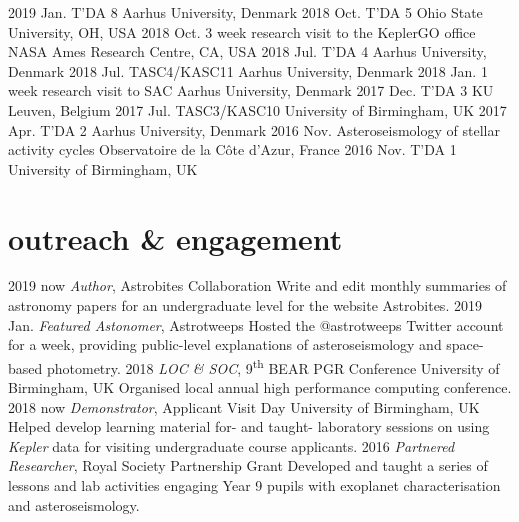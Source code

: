 \documentclass[]{k-cv} %
\begin{document}
\begin{entrylist}
\entrythree
{2019 Jan.}
{T'DA 8}
{Aarhus University, Denmark}
\entrythree
{2018 Oct.}
{T'DA 5}
{Ohio State University, OH, USA}
\entrythree
{2018 Oct.}
{3 week research visit to the KeplerGO office}
{NASA Ames Research Centre, CA, USA}
\entrythree
{2018 Jul.}
{T'DA 4}
{Aarhus University, Denmark}
\entrythree
{2018 Jul.}
{TASC4/KASC11}
{Aarhus University, Denmark}
\entrythree
{2018 Jan.}
{1 week research visit to SAC}
{Aarhus University, Denmark}
\entrythree
{2017 Dec.}
{T'DA 3}
{KU Leuven, Belgium}
\entrythree
{2017 Jul.}
{TASC3/KASC10}
{University of Birmingham, UK}
\entrythree
{2017 Apr.}
{T'DA 2}
{Aarhus University, Denmark}
\entrythree
{2016 Nov.}
{Asteroseismology of stellar activity cycles}
{Observatoire de la C\^{o}te d'Azur, France}
\entrythree
{2016 Nov.}
{T'DA 1}
{University of Birmingham, UK}
\end{entrylist}

\section{outreach \& engagement}

\begin{entrylist}
\entry
{2019 \to now}
{\emph{Author}, Astrobites Collaboration}
{}
{Write and edit monthly summaries of astronomy papers for an undergraduate level for the website Astrobites.}
\entry
{2019 Jan.}
{\emph{Featured Astonomer}, Astrotweeps}
{}
{Hosted the @astrotweeps Twitter account for a week, providing public-level explanations of asteroseismology and space-based photometry.}
\entry
{2018 }
{\emph{LOC \& SOC}, 9\textsuperscript{th} BEAR PGR Conference}
{University of Birmingham, UK}
{Organised local annual high performance computing conference.}
\entry
{2018 \to now}
{\emph{Demonstrator}, Applicant Visit Day}
{University of Birmingham, UK}
{Helped develop learning material for- and taught- laboratory sessions on using \emph{Kepler} data for visiting undergraduate course applicants.}
\entry
{2016 }
{\emph{Partnered Researcher}, Royal Society Partnership Grant}
{}
{Developed and taught a series of lessons and lab activities engaging Year 9 pupils with exoplanet characterisation and asteroseismology.}
\end{entrylist}
{}
\end{document}
